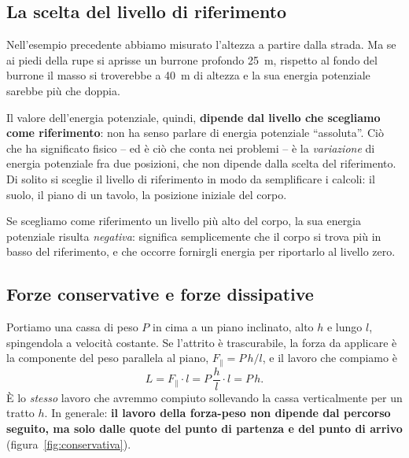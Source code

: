 \subsection{La scelta del livello di riferimento}

Nell'esempio precedente abbiamo misurato l'altezza a partire dalla strada. Ma se ai piedi della rupe si aprisse un burrone profondo \SI{25}{\metre}, rispetto al fondo del burrone il masso si troverebbe a \SI{40}{\metre} di altezza e la sua energia potenziale sarebbe più che doppia.

Il valore dell'energia potenziale, quindi, \textbf{dipende dal livello che scegliamo come riferimento}: non ha senso parlare di energia potenziale ``assoluta''. Ciò che ha significato fisico -- ed è ciò che conta nei problemi -- è la \emph{variazione} di energia potenziale fra due posizioni, che non dipende dalla scelta del riferimento. Di solito si sceglie il livello di riferimento in modo da semplificare i calcoli: il suolo, il piano di un tavolo, la posizione iniziale del corpo.

\begin{remark}
Se scegliamo come riferimento un livello più alto del corpo, la sua energia potenziale risulta \emph{negativa}: significa semplicemente che il corpo si trova più in basso del riferimento, e che occorre fornirgli energia per riportarlo al livello zero.
\end{remark}

\subsection{Forze conservative e forze dissipative}

Portiamo una cassa di peso $P$ in cima a un piano inclinato, alto $h$ e lungo $l$, spingendola a velocità costante. Se l'attrito è trascurabile, la forza da applicare è la componente del peso parallela al piano, $F_\parallel = P\,h/l$, e il lavoro che compiamo è
\[ L = F_\parallel \cdot l = P\,\frac{h}{l}\cdot l = P\,h. \]
È lo \emph{stesso} lavoro che avremmo compiuto sollevando la cassa verticalmente per un tratto $h$. In generale: \textbf{il lavoro della forza-peso non dipende dal percorso seguito, ma solo dalle quote del punto di partenza e del punto di arrivo} (figura~\ref{fig:conservativa}).

